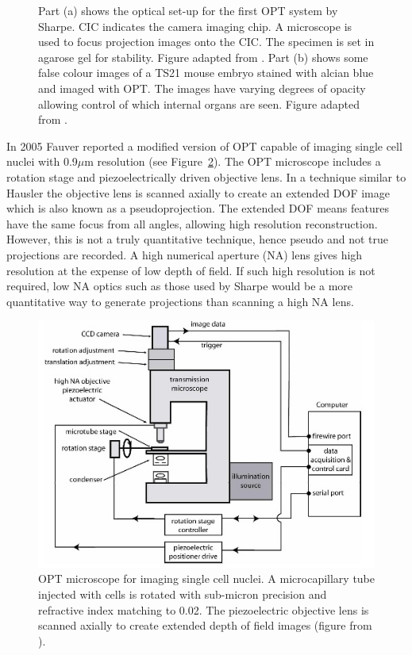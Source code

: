 \documentclass[12pt]{article}
\begin{document}
\begin{figure}[H]
\caption{Part (a) shows the optical set-up for the first OPT system by Sharpe. CIC indicates the camera imaging chip. A microscope is used to focus projection images onto the CIC. The specimen is set in agarose gel for stability. Figure adapted from \cite{Sharpe:2002jp}. Part (b) shows some false colour images of a TS21 mouse embryo stained with alcian blue and imaged with OPT. The images have varying degrees of opacity allowing control of which internal organs are seen. Figure  adapted from \cite{Sharpe:2003cm}.}
\label{fig:SharpeOPT}
\end{figure}




In 2005 Fauver reported a modified version of OPT capable of imaging single cell nuclei with 0.9$\mu$m resolution (see Figure~\ref{fig:fauver_setup}).\cite{Fauver:2005} The OPT microscope includes a rotation stage and  piezoelectrically driven objective lens. In a technique similar to Hausler \cite{hausler1972method} the objective lens is scanned axially to create an extended DOF image which is also known as a pseudoprojection. The extended DOF means features have the same focus from all angles, allowing high resolution reconstruction. However, this is not a truly quantitative technique, hence pseudo and not true projections are recorded. A high numerical aperture (NA) lens gives high resolution at the expense of low depth of field. If such high resolution is not required, low NA optics such as those used by Sharpe would be a more quantitative way to generate  projections than scanning a high NA lens.



\begin{figure}[H]
\centering
\includegraphics[scale=0.8]{Fauver_2005_setup.jpg}
\caption{OPT microscope for imaging single cell nuclei. A microcapillary tube injected with cells is rotated with sub-micron precision and refractive index matching  to 0.02. The piezoelectric objective lens is scanned axially to create extended depth of field images (figure from \cite{Fauver:2005}).}
\label{fig:fauver_setup}
\end{figure}
\end{document}
